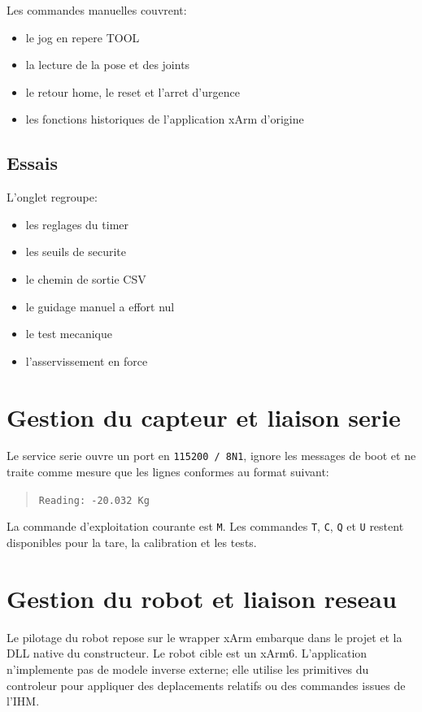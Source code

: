 \documentclass[11pt,a4paper]{article}
\begin{document}
Les commandes manuelles couvrent:

\begin{itemize}
    \item le jog en repere TOOL
    \item la lecture de la pose et des joints
    \item le retour home, le reset et l'arret d'urgence
    \item les fonctions historiques de l'application xArm d'origine
\end{itemize}

\subsection{Essais}

L'onglet regroupe:

\begin{itemize}
    \item les reglages du timer
    \item les seuils de securite
    \item le chemin de sortie CSV
    \item le guidage manuel a effort nul
    \item le test mecanique
    \item l'asservissement en force
\end{itemize}

\section{Gestion du capteur et liaison serie}

Le service serie ouvre un port en \texttt{115200 / 8N1}, ignore les messages de boot et ne traite comme mesure que les lignes conformes au format suivant:

\begin{quote}
\texttt{Reading: -20.032 Kg}
\end{quote}

La commande d'exploitation courante est \texttt{M}. Les commandes \texttt{T}, \texttt{C}, \texttt{Q} et \texttt{U} restent disponibles pour la tare, la calibration et les tests.

\section{Gestion du robot et liaison reseau}

Le pilotage du robot repose sur le wrapper xArm embarque dans le projet et la DLL native du constructeur.
Le robot cible est un xArm6. L'application n'implemente pas de modele inverse externe; elle utilise les primitives du controleur pour appliquer des deplacements relatifs ou des commandes issues de l'IHM.
\end{document}
